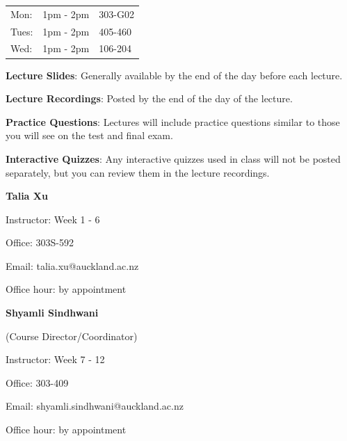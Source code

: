 \begin{slide}

	
	\begin{tabular}{l l l}
		Mon: & 1pm - 2pm & 303-G02 \\
		Tues: & 1pm - 2pm & 405-460 \\
		Wed: & 1pm - 2pm & 106-204 \\
	\end{tabular}
	
	\bigskip
	
	\textbf{Lecture Slides}: Generally available by the end of the day before each lecture.
	
	\medskip
	
	\textbf{Lecture Recordings}: Posted by the end of the day of the lecture.
	
	\medskip
	
	\textbf{Practice Questions}: Lectures will include practice questions similar to those you will see on the test and final exam.
	
	\medskip
	
	\textbf{Interactive Quizzes}: Any interactive quizzes used in class will not be posted separately, but you can review them in the lecture recordings.
	
\end{slide}

\begin{slide}

  
        \textbf{Talia Xu}
                
        \leftspace Instructor: Week 1 - 6
        
        \leftspace Office: 303S-592
        
        \leftspace Email: talia.xu@auckland.ac.nz
        
		\leftspace Office hour: by appointment
    
    \bigskip
    
        \textbf{Shyamli Sindhwani}
        
        (Course Director/Coordinator)
        
        \leftspace Instructor: Week 7 - 12
        
        \leftspace Office: 303-409
        
        \leftspace Email: shyamli.sindhwani@auckland.ac.nz
        
		\leftspace Office hour: by appointment
  
\end{slide}

